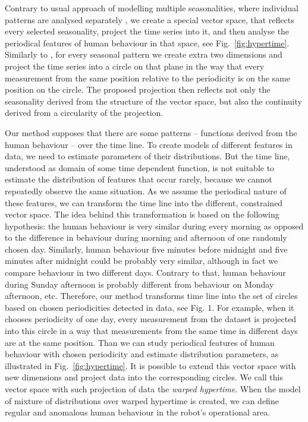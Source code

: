 Contrary to usual approach of modelling multiple seasonalities, where individual patterns are analysed separately \cite{gould2008forecasting}, we create a special vector space, that reflects every selected seasonality, project the time series into it, and then analyse the periodical features of human behaviour in that space, see Fig.~\ref{fig:hypertime}.
Similarly to \cite{vintr2017spatiotemporal}, for every seasonal pattern we create extra two dimensions and project the time series into a circle on that plane in the way that every measurement from the same position relative to the periodicity is on the same position on the circle.
The proposed projection then reflects not only the seasonality derived from the structure of the vector space, but also the continuity derived from a circularity of the projection.

Our method supposes that there are some patterns -- functions derived from the human behaviour -- over the time line.
To create models of different features in data, we need to estimate parameters of their distributions.
But the time line, understood as domain of some time dependent function, is not suitable to estimate the distribution
of features that occur rarely, because we cannot repeatedly observe the same situation.
As we assume the periodical nature of these features, we can transform the time line into the different, constrained vector space.
The idea behind this transformation is based on the following hypothesis: the human  behaviour is very similar during every morning as opposed to the difference in behaviour during morning and afternoon of one randomly chosen day.
Similarly, human behaviour five minutes before midnight and five minutes after midnight could be probably very similar, although in fact we compare behaviour in two different days.
Contrary to that, human behaviour during Sunday afternoon is probably different from behaviour on Monday afternoon, etc.
Therefore, our method transforms time line into the set of circles based on chosen periodicities detected in data, see Fig. 1.
For example, when it chooses periodicity of one day, every measurement from the dataset is projected into this circle in a way that measurements from the same time in different days are at the same position.
Than we can study periodical features of human behaviour with chosen periodicity and estimate distribution parameters, as illustrated in Fig.~\ref{fig:hypertime}.
It is possible to extend this vector space with new dimensions and project data into the corresponding circles.
We call this vector space with such projection of data the \textit{warped hypertime}.
When the model of mixture of distributions over warped hypertime is created, we can define regular and anomalous human behaviour in the robot's operational area.

